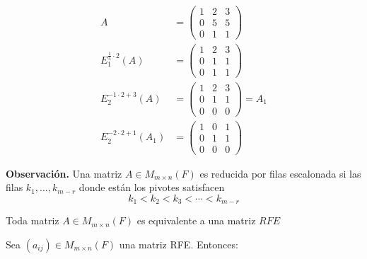 \documentclass[12pt,a4paper]{book}
\begin{document}
    \begin{ejemplo}
    \label{ej:9}
        \begin{align*}
            A&=
            \begin{pmatrix}
                1 & 2 & 3\\
                0 & 5 & 5\\
                0 & 1 & 1
            \end{pmatrix}
            \\
            E_{1}^{\frac{1}{5}\cdot2}(A)&=
            \begin{pmatrix}
                1 & 2 & 3\\
                0 & 1 & 1\\
                0 & 1 & 1
            \end{pmatrix}
            \\
            E_{2}^{-1\cdot2+3}(A)&=
            \begin{pmatrix}
                1 & 2 & 3\\
                0 & 1 & 1\\
                0 & 0 & 0
            \end{pmatrix}
            =A_{1}
            \\
            E_{2}^{-2\cdot2+1}(A_{1})&=
            \begin{pmatrix}
                1 & 0 & 1\\
                0 & 1 & 1\\
                0 & 0 & 0
            \end{pmatrix}
        \end{align*}
    \end{ejemplo}
    \textbf{Observación.} Una matriz $A\in M_{m\times n}(F)$ es reducida por filas escalonada si las filas
    $k_{1},\dots,k_{m-r}$ donde están los pivotes satisfacen
    \begin{equation*}
        k_{1}\lt k_{2}\lt k_{3}\lt \cdots\lt k_{m-r}
    \end{equation*}

    \begin{corolario}
    \label{coro:1}
        Toda matriz $A\in M_{m\times n}(F)$ es equivalente a una matriz $RFE$
    \end{corolario}

    Sea $(a_{ij}) \in M_{m \times n}(F)$ una matriz RFE. Entonces:
\end{document}
